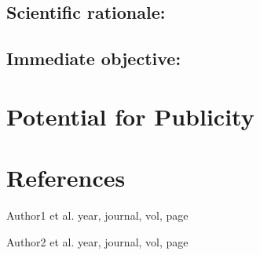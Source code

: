 \documentclass[12pt,a4paper]{article}  %
\begin{document}
\subsection{Scientific rationale:}


\subsection{Immediate objective:}



\section{Potential for Publicity}




\section{References}


\noindent [1] Author1 et al. year, journal, vol, page

\noindent [2] Author2 et al. year, journal, vol, page


\end{document}
